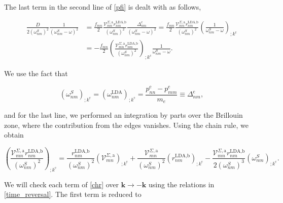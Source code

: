 \documentclass[10pt]{article}
\begin{document}
The last term in the second line of \eqref{pfi} is dealt with as follows,

\begin{align}\label{dresn}
\frac{D}{2(\omega^S_{nm})^2}\frac{1}{(\omega^S_{nm}-\omega)^2} 
&= \frac{f_{mn}}{2}\frac{\mathcal{V}^{\Sigma,\text{a}}_{mn}r^{\text{LDA,b}}_{nm}}{(\omega^S_{nm})^2}\frac{\Delta^{\text{c}}_{nm}}{(\omega^S_{nm}-\omega)^2} = \frac{f_{mn}}{2}\frac{\mathcal{V}^{\Sigma,\text{a}}_{mn}r^{\text{LDA,b}}_{nm}}{(\omega^S_{nm})^2}\left(\frac{1}{\omega^S_{nm}-\omega}\right)_{;k^{\text{c}}}\nonumber\\
&= -\frac{f_{mn}}{2}\left(\frac{\mathcal{V}^{\Sigma,\text{a}}_{mn}r^{\text{LDA,b}}_{nm}}{(\omega^S_{nm})^2}\right)_{;k^{\text{c}}}\frac{1}{\omega^S_{nm}-\omega}.
\end{align} 

We use the fact that

\begin{equation}\label{wk}
(\omega^S_{nm})_{;k^{\text{c}}}=(\omega^\text{LDA}_{nm})_{;k^{\text{c}}} = \frac{p_{nn}^{\text{c}}-p_{mm}^{\text{c}}}{m_{e}} \equiv \Delta_{nm}^{\text{c}},
\end{equation}

and for the last line, we performed an integration by parts over the Brillouin zone, where the contribution from the edges vanishes. Using the chain rule, we obtain

\begin{equation}\label{chr}
\left(\frac{\mathcal{V}^{\Sigma,\text{a}}_{mn}r^{\text{LDA,b}}_{nm}}{(\omega^{S}_{nm})^2}\right)_{;k^{\text{c}}} = \frac{r^{\text{LDA,b}}_{nm}}{(\omega^{S}_{nm})^2}\left(\mathcal{V} ^{\Sigma,\text{a}}_{mn}\right)_{;k^{\text{c}}} + \frac{\mathcal{V}^{\Sigma,\text{a}}_{mn}}{(\omega^{S}_{nm})^2}\left(r^{\text{LDA,b}}_{nm}\right)_{;k^{\text{c}}} - \frac{\mathcal{V}^{\Sigma,\text{a}}_{mn}r^{\text{LDA,b}}_{nm}}{2(\omega^{S}_{nm})^3}\left(
\omega^{S}_{nm}\right)_{;k^{\text{c}}}.
\end{equation}

We will check each term of \eqref{chr} over $\mathbf{k} \rightarrow - \mathbf{k}$ using the relations in \eqref{time_reversal}. The first term is reduced to
\end{document}
